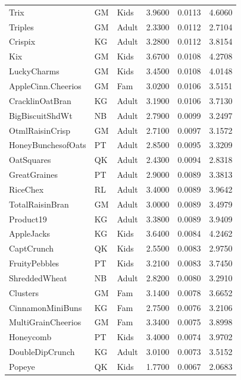 \begin{table}[!htbp]
\begin{tabular}{lllrrr}
Trix & GM & Kids & 3.9600 & 0.0113 & 4.6060 \\
Triples & GM & Adult & 2.3300 & 0.0112 & 2.7104 \\
Crispix & KG & Adult & 3.2800 & 0.0112 & 3.8154 \\
Kix & GM & Kids & 3.6700 & 0.0108 & 4.2708 \\
LuckyCharms & GM & Kids & 3.4500 & 0.0108 & 4.0148 \\
AppleCinn.Cheerios & GM & Fam & 3.0200 & 0.0106 & 3.5151 \\
CracklinOatBran & KG & Adult & 3.1900 & 0.0106 & 3.7130 \\
BigBiscuitShdWt & NB & Adult & 2.7900 & 0.0099 & 3.2497 \\
OtmlRaisinCrisp & GM & Adult & 2.7100 & 0.0097 & 3.1572 \\
HoneyBunchesofOats & PT & Adult & 2.8500 & 0.0095 & 3.3209 \\
OatSquares & QK & Adult & 2.4300 & 0.0094 & 2.8318 \\
GreatGraines & PT & Adult & 2.9000 & 0.0089 & 3.3813 \\
RiceChex & RL & Adult & 3.4000 & 0.0089 & 3.9642 \\
TotalRaisinBran & GM & Adult & 3.0000 & 0.0089 & 3.4979 \\
Product19 & KG & Adult & 3.3800 & 0.0089 & 3.9409 \\
AppleJacks & KG & Kids & 3.6400 & 0.0084 & 4.2462 \\
CaptCrunch & QK & Kids & 2.5500 & 0.0083 & 2.9750 \\
FruityPebbles & PT & Kids & 3.2100 & 0.0083 & 3.7450 \\
ShreddedWheat & NB & Adult & 2.8200 & 0.0080 & 3.2910 \\
Clusters & GM & Fam & 3.1400 & 0.0078 & 3.6652 \\
CinnamonMiniBuns & KG & Fam & 2.7500 & 0.0076 & 3.2106 \\
MultiGrainCheerios & GM & Fam & 3.3400 & 0.0075 & 3.8998 \\
Honeycomb & PT & Kids & 3.4000 & 0.0074 & 3.9702 \\
DoubleDipCrunch & KG & Adult & 3.0100 & 0.0073 & 3.5152 \\
Popeye & QK & Kids & 1.7700 & 0.0067 & 2.0683 \\
\bottomrule
\end{tabular}

\end{table}
